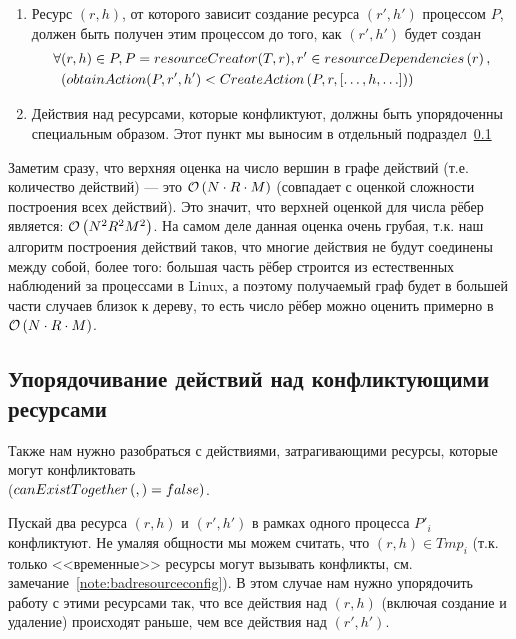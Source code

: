 \begin{enumerate}
	\item \label{chap2:preced:f} \label{chap2:preced:lastSimple} Ресурс $(r, h)$, от которого зависит создание ресурса $(r', h')$ процессом $P$, должен быть получен этим процессом до того, как $(r', h')$ будет создан
		\begin{align*}
			\forall & (r, h) \in P, P = resourceCreator(T, r), r' \in resourceDependencies\left( r \right), \\
			&(obtainAction(P, r', h') < CreateAction\left( P, r, [\ldots, h, \ldots] \right))
		\end{align*}

	\item \label{chap2:preced:g} Действия над ресурсами, которые конфликтуют, должны быть упорядоченны специальным образом. Этот пункт мы выносим в отдельный подраздел~\ref{chap2:subsec:conflictresolution}
\end{enumerate}

Заметим сразу, что верхняя оценка на число вершин в графе действий (т.е. количество действий) --- это $\mathcal{O}\left(N \cdot R \cdot M\right)$ (совпадает с оценкой сложности построения всех действий). Это значит, что верхней оценкой для числа рёбер является: $\mathcal{O}\left(N^2R^2M^2\right)$. На самом деле данная оценка очень грубая, т.к. наш алгоритм построения действий таков, что многие действия не будут соединены между собой, более того: большая часть рёбер строится из естественных наблюдений
за процессами в Linux, а поэтому получаемый граф будет в большей части случаев близок к дереву, то есть число рёбер можно оценить примерно в $\mathcal{O}\left(N\cdot R \cdot M\right)$.

\subsection{Упорядочивание действий над конфликтующими ресурсами}
\label{chap2:subsec:conflictresolution}

Также нам нужно разобраться с действиями, затрагивающими ресурсы, которые могут конфликтовать \\
($canExistTogether\left( ,  \right) = false)$. 

Пускай два ресурса $(r, h)$ и $(r', h')$ в рамках одного процесса $P'_i$ конфликтуют. 
Не умаляя общности мы можем считать, что $(r, h) \in Tmp_i$ 
(т.к. только <<временные>> ресурсы могут вызывать конфликты, см. замечание~\ref{note:badresourceconfig}). 
В этом случае нам нужно упорядочить работу с этими ресурсами так, что все действия над $(r, h)$ 
(включая создание и удаление) происходят раньше, чем все действия над $(r', h')$.

